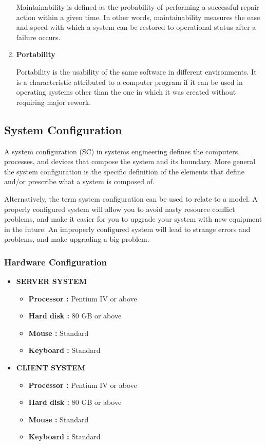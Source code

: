 \begin{enumerate}
Maintainability is defined as the probability of performing a successful repair action within a given time. In other words, maintainability measures the ease and speed with which a system can be restored to operational status after a failure occurs.

\item {\bf Portability}

Portability is the usability of the same software in different environments. It is a characteristic attributed to a computer program if it can be used in operating systems other than the one in which it was created without requiring major rework. 

\end{enumerate}
%
\subsection{System Configuration}
A system configuration (SC) in systems engineering defines the computers, processes, and devices that compose the system and its boundary. More general the system configuration is the specific definition of the elements that define and/or prescribe what a system is composed of.  

Alternatively, the term system configuration can be used to relate to a model. A properly configured system will allow you to avoid nasty resource conflict problems, and make it easier for you to upgrade your system with new equipment in the future. An improperly configured system will lead to strange errors and problems, and make upgrading a big problem.   

%
\subsubsection{Hardware Configuration}
\begin{itemize}
\item {\bf SERVER SYSTEM}
\begin{itemize}
\item {\bf Processor :} Pentium IV or above
\item {\bf Hard disk :}	80 GB or above
\item {\bf Mouse :} Standard
\item {\bf Keyboard :} Standard
\end{itemize}
\item {\bf CLIENT SYSTEM}
\begin{itemize}
\item {\bf Processor :} Pentium IV or above
\item {\bf Hard disk :}	80 GB or above
\item {\bf Mouse :} Standard
\item {\bf Keyboard :} Standard
\end{itemize}
\end{itemize}
%
